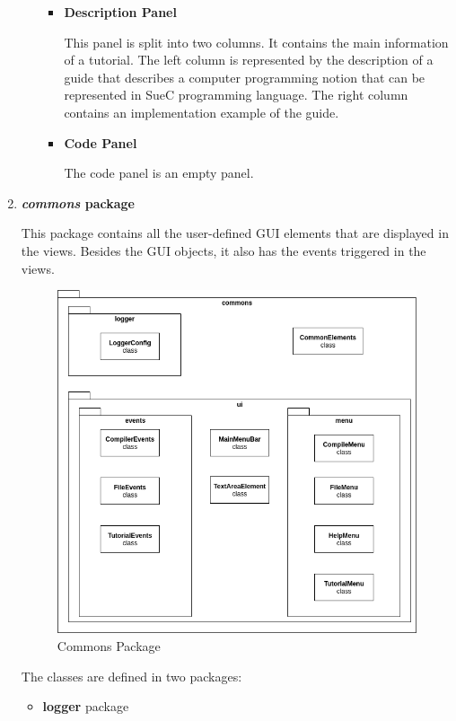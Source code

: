 \documentclass[12pt,a4paper,twoside]{report}
\begin{document}
\begin{enumerate}
\begin{enumerate}
\begin{itemize}
 \item \textbf{Description Panel}
 
 This panel is split into two columns. It contains the main information of a tutorial. The left column is represented by the description of a guide that describes a computer programming notion that can be represented in SueC programming language. The right column contains an implementation example of the guide.
 
 \item \textbf{Code Panel}
 
 The code panel is an empty panel.  
 \end{itemize}


\end{enumerate}



\item \textbf{\textit{commons} package}

This package contains all the user-defined GUI elements that are displayed in the views. Besides the GUI objects, it also has the events triggered in the views. 

\begin{figure}[H]
    \centering
    \includegraphics[width=0.8\linewidth]{img/diags/CommonsPackage.png}
    \caption{Commons Package}
    \label{fig:conf}
\end{figure}

The classes are defined in two packages: 
\begin{itemize}
 \item \textbf{logger} package 
 

\end{itemize}
\end{enumerate}
\end{document}
